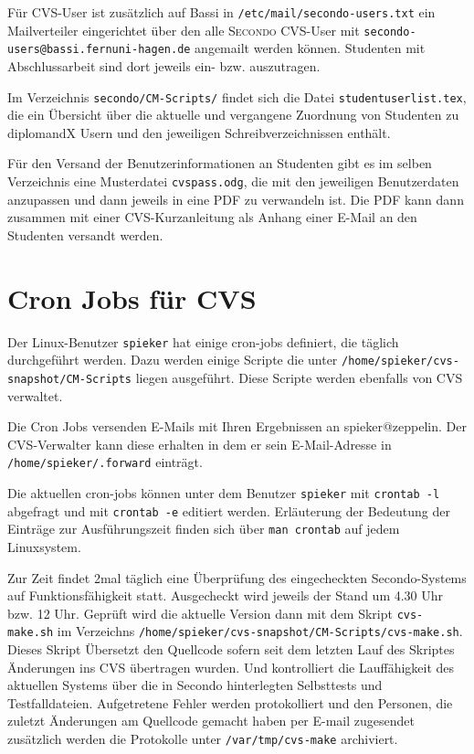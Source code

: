 \documentclass[a4paper, 10pt]{article}
\newcommand{\file}[1]{\texttt{#1}}
\begin{document}
F\"ur CVS-User ist zus\"atzlich auf Bassi in \file{/etc/mail/secondo-users.txt}
ein Mailverteiler eingerichtet \"uber den alle \textsc{Secondo} CVS-User mit
\file{secondo-users@bassi.fernuni-hagen.de}
angemailt werden k\"onnen. Studenten mit Abschlussarbeit sind dort jeweils
ein- bzw. auszutragen.

Im Verzeichnis \file{secondo/CM-Scripts/} findet sich die Datei
\file{studentuserlist.tex}, die ein \"Ubersicht \"uber die aktuelle und vergangene
Zuordnung von Studenten zu diplomandX Usern und den jeweiligen Schreibverzeichnissen
enth\"alt.

F\"ur den Versand der Benutzerinformationen an Studenten gibt es im selben Verzeichnis
eine Musterdatei \file{cvspass.odg}, die mit den jeweiligen Benutzerdaten
anzupassen und dann jeweils in eine PDF zu verwandeln ist. Die PDF kann dann
zusammen mit einer CVS-Kurzanleitung als Anhang einer E-Mail an den Studenten
versandt werden.

\section{Cron Jobs f\"ur CVS}
Der Linux-Benutzer \file{spieker} hat einige cron-jobs definiert, die t\"aglich
durchgef\"uhrt werden. Dazu werden einige Scripte die unter
\file{/home/spieker/cvs-snapshot/CM-Scripts} liegen ausgef\"uhrt.
Diese Scripte werden ebenfalls von CVS verwaltet.

Die Cron Jobs versenden E-Mails mit Ihren Ergebnissen an spieker@zeppelin. Der
CVS-Verwalter kann diese erhalten in dem er sein E-Mail-Adresse in
\file{/home/spieker/.forward} eintr\"agt.

Die aktuellen cron-jobs k\"onnen unter dem Benutzer \file{spieker} mit
\file{crontab -l} abgefragt und mit \file{crontab -e} editiert werden.
Erl\"auterung der Bedeutung der Eintr\"age zur Ausf\"uhrungszeit finden sich
\"uber \file{man crontab} auf jedem Linuxsystem.

Zur Zeit findet 2mal t\"aglich eine \"Uberpr\"ufung des eingecheckten Secondo-Systems
auf Funktionsf\"ahigkeit statt. Ausgecheckt wird jeweils der Stand um 4.30 Uhr bzw.
12 Uhr. Gepr\"uft wird die aktuelle Version dann mit dem Skript \file{cvs-make.sh}
im Verzeichns \file{/home/spieker/cvs-snapshot/CM-Scripts/cvs-make.sh}. Dieses
Skript \"Ubersetzt den Quellcode sofern seit dem letzten Lauf des Skriptes
\"Anderungen ins CVS \"ubertragen wurden. Und kontrolliert die Lauff\"ahigkeit
des aktuellen Systems \"uber die in Secondo hinterlegten Selbsttests und Testfalldateien.
Aufgetretene Fehler werden protokolliert und den Personen, die zuletzt
\"Anderungen am Quellcode gemacht haben per E-mail zugesendet zus\"atzlich
werden die Protokolle unter \file{/var/tmp/cvs-make} archiviert.
\end{document}
